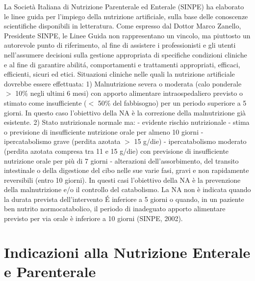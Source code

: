\documentclass[11pt,a4paper,oneside]{book}
\begin{document}
La Societ\`a Italiana di Nutrizione Parenterale ed Enterale (SINPE) ha elaborato le linee guida per l'impiego della nutrizione artificiale, sulla base delle conoscenze scientifiche disponibili in letteratura. Come espresso dal Dottor Marco Zanello, Presidente SINPE, le Linee Guida non rappresentano un vincolo, ma piuttosto un autorevole punto di riferimento, al fine di assistere i professionisti e gli utenti nell'assumere decisioni sulla gestione appropriata di specifiche condizioni cliniche e al fine di garantire abilit\'a, comportamenti e trattamenti appropriati, efficaci, efficienti, sicuri ed etici. 
Situazioni cliniche nelle quali la nutrizione artificiale dovrebbe essere effettuata: 
1) Malnutrizione severa o moderata (calo ponderale $>$ 10\% negli ultimi 6 mesi) con apporto alimentare intraospedaliero previsto o stimato come insufficiente ($<$ 50\% del fabbisogno) per un periodo superiore a 5 giorni. In questo caso l'obiettivo della NA \`e la correzione della malnutrizione gi\`a esistente.
2) Stato nutrizionale normale ma:
- evidente rischio nutrizionale
- stima o previsione di insufficiente nutrizione orale per almeno 10 giorni
- ipercatabolismo grave (perdita azotata $>$ 15 g/die)
- ipercatabolismo moderato (perdita azotata compresa tra 11 e 15 g/die) con previsione di insufficiente nutrizione orale per pi\`u di 7 giorni 
- alterazioni dell'assorbimento, del transito intestinale o della digestione del cibo nelle sue varie fasi, gravi e non rapidamente reversibili (entro 10 giorni). 
In questi casi l'obiettivo della NA \`e la prevenzione della malnutrizione e/o il controllo del catabolismo. 
La NA non \`e indicata quando la durata prevista dell'intervento \'E inferiore a 5 giorni o quando, in un paziente ben nutrito normocatabolico, il periodo di inadeguato apporto alimentare previsto per via orale \`e inferiore a 10 giorni (SINPE, 2002). 


\section{Indicazioni alla Nutrizione Enterale e Parenterale }
\end{document}

